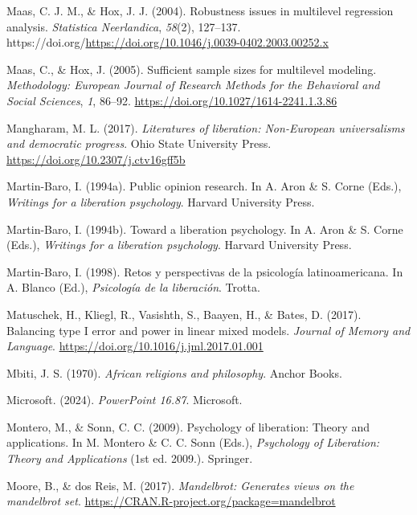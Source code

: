 \documentclass[
  letterpaper,
  DIV=11,
  numbers=noendperiod]{scrreprt}
\newlength{\cslhangindent}
\newenvironment{CSLReferences}[2] %
 {\begin{list}{}{%
  \setlength{\itemindent}{0pt}
  \setlength{\leftmargin}{0pt}
  \setlength{\parsep}{0pt}
  \ifodd #1
   \setlength{\leftmargin}{\cslhangindent}
   \setlength{\itemindent}{-1\cslhangindent}
  \fi
  \setlength{\itemsep}{#2\baselineskip}}}
 {\end{list}}
\begin{document}
\begin{CSLReferences}{1}{0}
Maas, C. J. M., \& Hox, J. J. (2004). Robustness issues in multilevel
regression analysis. \emph{Statistica Neerlandica}, \emph{58}(2),
127--137.
https://doi.org/\url{https://doi.org/10.1046/j.0039-0402.2003.00252.x}

Maas, C., \& Hox, J. (2005). Sufficient sample sizes for multilevel
modeling. \emph{Methodology: European Journal of Research Methods for
the Behavioral and Social Sciences}, \emph{1}, 86--92.
\url{https://doi.org/10.1027/1614-2241.1.3.86}

Mangharam, M. L. (2017). \emph{Literatures of liberation: Non-{E}uropean
universalisms and democratic progress}. Ohio State University Press.
\url{https://doi.org/10.2307/j.ctv16gff5b}

Martin-Baro, I. (1994a). Public opinion research. In A. Aron \& S. Corne
(Eds.), \emph{Writings for a liberation psychology}. Harvard University
Press.

Martin-Baro, I. (1994b). Toward a liberation psychology. In A. Aron \&
S. Corne (Eds.), \emph{Writings for a liberation psychology}. Harvard
University Press.

Martin-Baro, I. (1998). {Retos y perspectivas de la psicología
latinoamericana}. In A. Blanco (Ed.), \emph{Psicología de la
liberación}. Trotta.

Matuschek, H., Kliegl, R., Vasishth, S., Baayen, H., \& Bates, D.
(2017). Balancing type {I} error and power in linear mixed models.
\emph{Journal of Memory and Language}.
\url{https://doi.org/10.1016/j.jml.2017.01.001}

Mbiti, J. S. (1970). \emph{African religions and philosophy}. Anchor
Books.

Microsoft. (2024). \emph{PowerPoint 16.87}. Microsoft.

Montero, M., \& Sonn, C. C. (2009). Psychology of liberation: Theory and
applications. In M. Montero \& C. C. Sonn (Eds.), \emph{Psychology of
Liberation: Theory and Applications} (1st ed. 2009.). Springer.

Moore, B., \& dos Reis, M. (2017). \emph{Mandelbrot: Generates views on
the mandelbrot set}. \url{https://CRAN.R-project.org/package=mandelbrot}


\end{CSLReferences}
\end{document}
